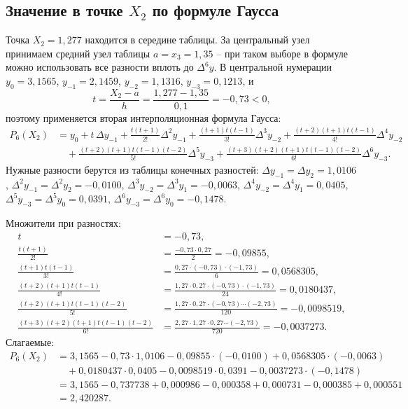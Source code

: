 \documentclass[12pt,a4paper]{article}
\begin{document}
\subsection*{Значение в точке $X_2$ по формуле Гаусса}
Точка $X_2=1{,}277$ находится в середине таблицы. За центральный узел принимаем средний узел таблицы $a=x_3=1{,}35$ -- при таком выборе в формуле можно использовать все разности вплоть до $\Delta^6y$. В центральной нумерации $y_0=3{,}1565$, $y_{-1}=2{,}1459$, $y_{-2}=1{,}1316$, $y_{-3}=0{,}1213$, и
\[
    t=\frac{X_2-a}{h}=\frac{1{,}277-1{,}35}{0{,}1}=-0{,}73<0,
\]
поэтому применяется вторая интерполяционная формула Гаусса:
\[
\begin{aligned}
    P_6(X_2)&=y_0+t\,\Delta y_{-1}+\frac{t(t+1)}{2!}\Delta^2y_{-1}+\frac{(t+1)t(t-1)}{3!}\Delta^3y_{-2}+\frac{(t+2)(t+1)t(t-1)}{4!}\Delta^4y_{-2}\\
    &\quad+\frac{(t+2)(t+1)t(t-1)(t-2)}{5!}\Delta^5y_{-3}+\frac{(t+3)(t+2)(t+1)t(t-1)(t-2)}{6!}\Delta^6y_{-3} .
\end{aligned}
\]
Нужные разности берутся из таблицы конечных разностей: $\Delta y_{-1}=\Delta y_2=1{,}0106$, $\Delta^2y_{-1}=\Delta^2y_2=-0{,}0100$, $\Delta^3y_{-2}=\Delta^3y_1=-0{,}0063$, $\Delta^4y_{-2}=\Delta^4y_1=0{,}0405$, $\Delta^5y_{-3}=\Delta^5y_0=0{,}0391$, $\Delta^6y_{-3}=\Delta^6y_0=-0{,}1478$.

Множители при разностях:
\[
\begin{aligned}
    t&=-0{,}73,\\
    \frac{t(t+1)}{2!}&=\frac{-0{,}73\cdot0{,}27}{2}=-0{,}09855,\\
    \frac{(t+1)t(t-1)}{3!}&=\frac{0{,}27\cdot(-0{,}73)\cdot(-1{,}73)}{6}=0{,}0568305,\\
    \frac{(t+2)(t+1)t(t-1)}{4!}&=\frac{1{,}27\cdot0{,}27\cdot(-0{,}73)\cdot(-1{,}73)}{24}=0{,}0180437,\\
    \frac{(t+2)(t+1)t(t-1)(t-2)}{5!}&=\frac{1{,}27\cdot0{,}27\cdot(-0{,}73)\cdots(-2{,}73)}{120}=-0{,}0098519,\\
    \frac{(t+3)(t+2)(t+1)t(t-1)(t-2)}{6!}&=\frac{2{,}27\cdot1{,}27\cdot0{,}27\cdots(-2{,}73)}{720}=-0{,}0037273 .
\end{aligned}
\]
Слагаемые:
\[
\begin{aligned}
    P_6(X_2)&=3{,}1565-0{,}73\cdot1{,}0106-0{,}09855\cdot(-0{,}0100)+0{,}0568305\cdot(-0{,}0063)\\
    &\quad+0{,}0180437\cdot0{,}0405-0{,}0098519\cdot0{,}0391-0{,}0037273\cdot(-0{,}1478)\\
    &=3{,}1565-0{,}737738+0{,}000986-0{,}000358+0{,}000731-0{,}000385+0{,}000551\\
    &=2{,}420287 .
\end{aligned}
\]
\end{document}
